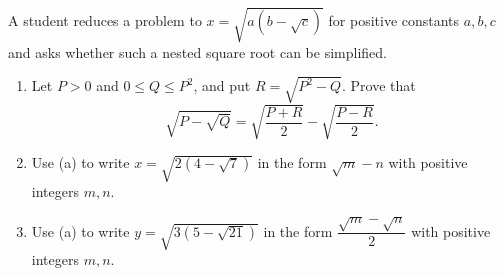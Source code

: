 A student reduces a problem to $x=\sqrt{a\left(b-\sqrt c\right)}$ for positive constants $a,b,c$ and asks whether such a nested square root can be simplified.
\begin{enumerate}
\item[(a)] Let $P>0$ and $0\le Q\le P^2$, and put $R=\sqrt{P^2-Q}$. Prove that
\[\sqrt{P-\sqrt Q}=\sqrt{\dfrac{P+R}{2}}-\sqrt{\dfrac{P-R}{2}}.\]
\item[(b)] Use (a) to write $x=\sqrt{2\left(4-\sqrt7\right)}$ in the form $\sqrt m-n$ with positive integers $m,n$.
\item[(c)] Use (a) to write $y=\sqrt{3\left(5-\sqrt{21}\right)}$ in the form $\dfrac{\sqrt m-\sqrt n}{2}$ with positive integers $m,n$.
\end{enumerate}
